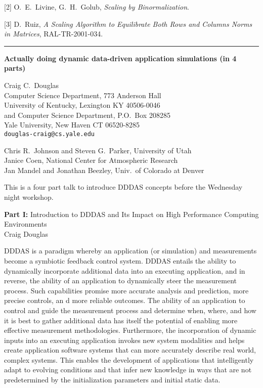 \documentclass[twosided]{report}
\begin{document}
[2] O.~E.~Livine, G.~H.~Golub,
{\em Scaling by Binormalization}.

[3] D.~Ruiz, {\em A Scaling Algorithm to Equilibrate
Both Rows and Columns Norms in Matrices}, RAL-TR-2001-034.



	\begin{center} \rule{6in}{1pt} \end{center}

\begin{center}
{\large			%
{\bf Actually doing dynamic data-driven application simulations (in 4 parts)}}

	Craig C.~Douglas \\
	Computer Science Department, 773 Anderson Hall \\
	University of Kentucky, Lexington KY 40506-0046 \\
	and Computer Science Department, P.O.~Box 208285 \\
	Yale University,  New Haven CT 06520-8285 \\
	{\tt douglas-craig@cs.yale.edu}

	Chris R.~Johnson and Steven G.~Parker, University of Utah \\
	Janice Coen, National Center for Atmospheric Research \\
	Jan Mandel and Jonathan Beezley, Univ.~of Colorado at Denver
\end{center}
This is a four part talk to introduce DDDAS concepts before
the Wednesday night workshop.

{\bf Part I:} Introduction to DDDAS and Its Impact on High
Performance Computing Environments \\
Craig Douglas

DDDAS is a paradigm whereby an application (or simulation)
and measurements become a symbiotic feedback control system.
DDDAS entails the ability to dynamically incorporate
additional data into an executing application, and in
reverse, the ability of an application to dynamically steer
the measurement process.  Such capabilities promise more
accurate analysis and prediction, more precise controls, an
d more reliable outcomes.  The ability of an application to
control and guide the measurement process and determine
when, where, and how it is best to gather additional data
has itself the potential of enabling more effective
measurement methodologies.  Furthermore, the incorporation
of dynamic inputs into an executing application invokes new
system modalities and helps create application software
systems that can more accurately describe real world,
complex systems.  This enables the development of
applications that intelligently adapt to evolving conditions
and that infer new knowledge in ways that are not
predetermined by the initialization parameters and initial
static data.
\end{document}
